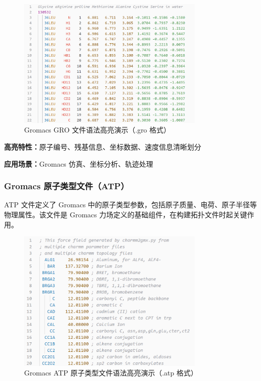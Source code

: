 \begin{figure}[!h]
    \centering
    \includegraphics[width=0.8\textwidth]{../images/gro.png}
    \caption{Gromacs GRO 文件语法高亮演示（.gro 格式）}
    \label{fig:gro-highlighting}
\end{figure}

\textbf{高亮特性：}原子编号、残基信息、坐标数据、速度信息清晰划分

\textbf{应用场景：}Gromacs 仿真、坐标分析、轨迹处理

\subsubsection{Gromacs 原子类型文件（ATP）}

ATP 文件定义了 Gromacs 中的原子类型参数，包括原子质量、电荷、原子半径等物理属性。该文件是 Gromacs 力场定义的基础组件，在构建拓扑文件时起关键作用。

\begin{figure}[!h]
    \centering
    \includegraphics[width=0.8\textwidth]{../images/atp.png}
    \caption{Gromacs ATP 原子类型文件语法高亮演示（.atp 格式）}
    \label{fig:atp-highlighting}
\end{figure}

